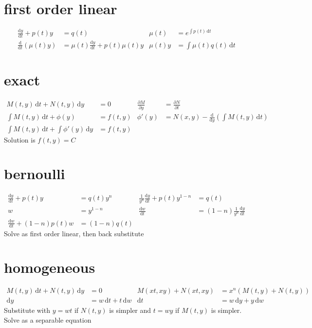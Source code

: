 \documentclass{article}
\begin{document}
\section*{first order linear}
\begin{align*}
\frac{\mathrm{d}y}{\mathrm{d}t}+p(t)y&=q(t) & \mu(t)&=e^{\int{p(t)\,\mathrm{d}t}}\\
\frac{\mathrm{d}}{\mathrm{d}t}\left(\mu(t)y\right)&=\mu(t)\frac{\mathrm{d}y}{\mathrm{d}t}+p(t)\mu(t)y & \mu(t)y&=\int{\mu(t)q(t)\,\mathrm{d}t}
\end{align*}

\section*{exact}
\begin{align*}
M(t,y)\,\mathrm{d}t+N(t,y)\,\mathrm{d}y&=0 & \frac{\partial M}{\partial y}&=\frac{\partial N}{\partial t}\\
\int{M(t,y)\,\mathrm{d}t}+\phi(y)&=f(t,y) & \phi'(y)&=N(x,y)-\frac{\mathrm{d}}{\mathrm{d}y}\left(\int{M(t,y)\,\mathrm{d}t}\right)\\
\int{M(t,y)\,\mathrm{d}t}+\int{\phi'(y)\,\mathrm{d}y}&=f(t,y)
\end{align*}
Solution is $f(t,y)=C$

\section*{bernoulli}
\begin{align*}
\frac{\mathrm{d}y}{\mathrm{d}t}+p(t)y&=q(t)y^n & \frac{1}{y^n}\frac{\mathrm{d}y}{\mathrm{d}t}+p(t)y^{1-n}&=q(t)\\
w&=y^{1-n} & \frac{\mathrm{d}w}{\mathrm{d}t}&=(1-n)\frac{1}{y^{n}}\frac{\mathrm{d}y}{\mathrm{d}t}\\
\frac{\mathrm{d}w}{\mathrm{d}t}+(1-n)p(t)w&=(1-n)q(t)
\end{align*}
Solve as first order linear, then back substitute

\section*{homogeneous}
\begin{align*}
M(t,y)\,\mathrm{d}t+N(t,y)\,\mathrm{d}y&=0 & M(xt,xy)+N(xt,xy)&=x^n\left(M(t,y)+N(t,y)\right)\\
\mathrm{d}y&=w\,\mathrm{d}t+t\,\mathrm{d}w &\mathrm{d}t&=w\,\mathrm{d}y+y\,\mathrm{d}w
\end{align*}
Substitute with $y=wt$ if $N(t,y)$ is simpler and $t=wy$ if $M(t,y)$ is simpler. Solve as a separable equation
\end{document}
